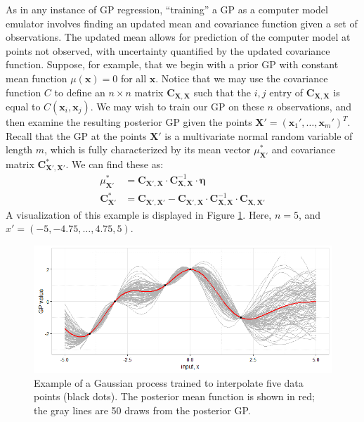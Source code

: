 \documentclass{article}
\begin{document}
As in any instance of GP regression, ``training'' a GP as a computer model emulator involves finding an updated mean and covariance function given a set of observations. The updated mean allows for prediction of the computer model at points not observed, with uncertainty quantified by the updated covariance function.
Suppose, for example, that we begin with a prior GP with constant mean function $\mu(\mathbf x)=0$ for all $\mathbf x$. Notice that we may use the covariance function $C$ to define an $n\times n$ matrix $\mathbf C_{\mathbf X,\mathbf X}$ such that the $i,j$ entry of $\mathbf C_{\mathbf X,\mathbf X}$ is equal to $C(\mathbf x_i,\mathbf x_j)$. We may wish to train our GP on these $n$ observations, and then examine the resulting posterior GP given the points $\mathbf X'=(\mathbf x_1',\ldots,\mathbf x_m')^T$. Recall that the GP at the points $\mathbf X'$ is a multivariate normal random variable of length $m$, which is fully characterized by its mean vector $\mu^*_{\mathbf X'}$ and covariance matrix $\mathbf C^*_{\mathbf X',\mathbf X'}$. We can find these as:
\begin{equation}\label{eq:post_gp}\begin{split}
\mu^*_{\mathbf X'}&=\mathbf C_{\mathbf X',\mathbf X}\cdot \mathbf C_{\mathbf X,\mathbf X} ^{-1}\cdot \boldsymbol \eta
\\
\mathbf C^*_{\mathbf X'}&=\mathbf C_{\mathbf X',\mathbf X'}-\mathbf C_{\mathbf X',\mathbf X}\cdot \mathbf C_{\mathbf X,\mathbf X}^{-1}\cdot \mathbf C_{\mathbf X,\mathbf X'}
\end{split}\end{equation}
A visualization of this example is displayed in Figure \ref{fig:gp_example}. Here, $n=5$, and $x'=(-5,-4.75,\ldots,4.75,5)$. 

\begin{figure}[h]
\centering
\includegraphics[width=.75\linewidth]{gp_example}
\captionsetup{width=.7\linewidth}
\caption{Example of a Gaussian process trained to interpolate five data points (black dots). The posterior mean function is shown in red; the gray lines are 50 draws from the posterior GP.}
\label{fig:gp_example}
\end{figure}
\end{document}
